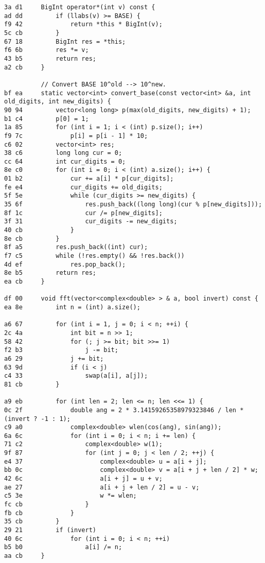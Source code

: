 \documentclass[11pt, a4paper, twoside]{article}
\begin{document}
\begin{lstlisting}
3a d1     BigInt operator*(int v) const {
ad dd         if (llabs(v) >= BASE) {
f9 42             return *this * BigInt(v);
5c cb         }
67 18         BigInt res = *this;
f6 6b         res *= v;
43 b5         return res;
a2 cb     }
      
          // Convert BASE 10^old --> 10^new.
bf ea     static vector<int> convert_base(const vector<int> &a, int old_digits, int new_digits) {
90 94         vector<long long> p(max(old_digits, new_digits) + 1);
b1 c4         p[0] = 1;
1a 85         for (int i = 1; i < (int) p.size(); i++)
f9 7c             p[i] = p[i - 1] * 10;
c6 02         vector<int> res;
38 c6         long long cur = 0;
cc 64         int cur_digits = 0;
8e c0         for (int i = 0; i < (int) a.size(); i++) {
01 b2             cur += a[i] * p[cur_digits];
fe e4             cur_digits += old_digits;
5f 5e             while (cur_digits >= new_digits) {
35 6f                 res.push_back((long long)(cur % p[new_digits]));
8f 1c                 cur /= p[new_digits];
3f 31                 cur_digits -= new_digits;
40 cb             }
8e cb         }
8f a5         res.push_back((int) cur);
f7 c5         while (!res.empty() && !res.back())
4d ef             res.pop_back();
8e b5         return res;
ea cb     }
      
df 00     void fft(vector<complex<double> > & a, bool invert) const {
ea 8e         int n = (int) a.size();
      
a6 67         for (int i = 1, j = 0; i < n; ++i) {
2c 4a             int bit = n >> 1;
58 42             for (; j >= bit; bit >>= 1)
f2 b3                 j -= bit;
a6 29             j += bit;
63 9d             if (i < j)
c4 33                 swap(a[i], a[j]);
81 cb         }
      
a9 eb         for (int len = 2; len <= n; len <<= 1) {
0c 2f             double ang = 2 * 3.14159265358979323846 / len * (invert ? -1 : 1);
c9 a0             complex<double> wlen(cos(ang), sin(ang));
6a 6c             for (int i = 0; i < n; i += len) {
71 c2                 complex<double> w(1);
9f 87                 for (int j = 0; j < len / 2; ++j) {
e4 37                     complex<double> u = a[i + j];
bb 0c                     complex<double> v = a[i + j + len / 2] * w;
42 6c                     a[i + j] = u + v;
ae 27                     a[i + j + len / 2] = u - v;
c5 3e                     w *= wlen;
fc cb                 }
fb cb             }
35 cb         }
29 21         if (invert)
40 6c             for (int i = 0; i < n; ++i)
b5 b0                 a[i] /= n;
aa cb     }
      

\end{lstlisting}
\end{document}
